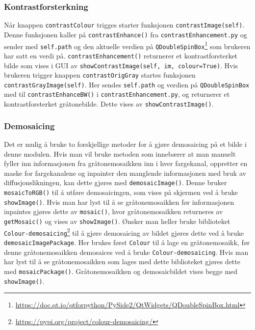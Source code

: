 \subsubsection{Kontrastforsterkning}
Når knappen \texttt{contrastColour} trigges starter funksjonen \texttt{contrastImage(self)}. Denne funksjonen kaller på \texttt{contrastEnhance()} fra \texttt{contrastEnhancement.py} og sender med \texttt{self.path} og den aktuelle verdien på \texttt{QDoubleSpinBox}\footnote{\url{https://doc.qt.io/qtforpython/PySide2/QtWidgets/QDoubleSpinBox.html}} som brukeren har satt en verdi på. \newline\texttt{contrastEnhancement()} returnerer et kontrastforsterket bilde som vises i GUI av \newline\texttt{showContrastImage(self, im, colour=True)}. Hvis brukeren trigger knappen \texttt{contrastOrigGray} startes funksjonen \texttt{contrastGrayImage(self)}. Her sendes \texttt{self.path} og verdien på \newline\texttt{QDoubleSpinBox} med til \texttt{contrastEnhanceBW()} i \texttt{contrastEnhancement.py}, og returnerer et kontrastforsterket gråtonebilde. Dette vises av \texttt{showContrastImage()}.

\subsubsection{Demosaicing}
Det er mulig å bruke to forskjellige metoder for å gjøre demosaicing på et bilde i denne modulen. Hvis man vil bruke metoden som innebærer at man manuelt fyller inn informasjonen fra gråtonemosaikken inn i hver fargekanal, oppretter en maske for fargekanalene og inpainter den manglende informasjonen med bruk av diffusjonslikningen, kan dette gjøres med \texttt{demosaicImage()}. Denne bruker \texttt{mosaicToRGB()} til å utføre demosaicingen, som vises på skjermen ved å bruke \texttt{showImage()}. Hvis man har lyst til å se gråtonemosaikken før informasjonen inpaintes gjøres dette av \texttt{mosaic()}, hvor gråtonemosaikken returneres av \texttt{getMosaic()} og vises av \texttt{showImage()}. Ønsker man heller bruke biblioteket \texttt{Colour-demosaicing}\footnote{\url{https://pypi.org/project/colour-demosaicing/}} til å gjøre demosaicing av bildet gjøres dette ved å bruke \texttt{demosaicImagePackage}. Her brukes først \texttt{Colour} til å lage en gråtonemosaikk, før denne gråtonemosaikken demosaices ved å bruke \texttt{Colour-demosaicing}. Hvis man har lyst til å se gråtonemosaikken som lages med dette biblioteket gjøres dette med \texttt{mosaicPackage()}. Gråtonemosaikken og demosaicbildet vises begge med \texttt{showImage()}.

